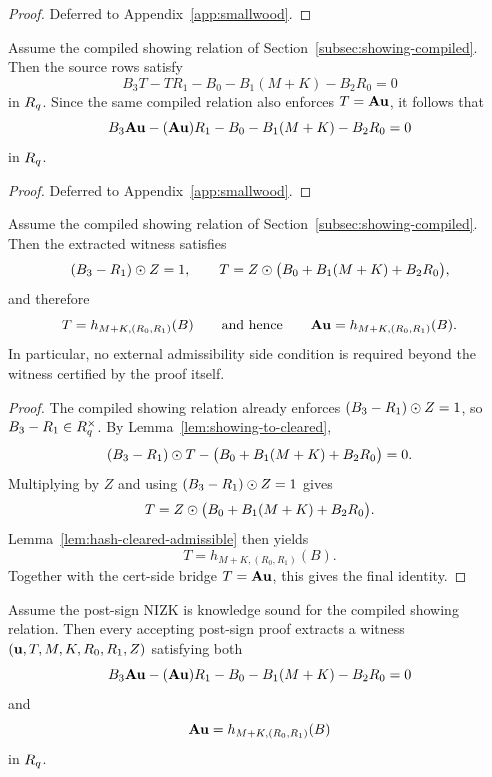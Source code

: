 \begin{proof}
Deferred to Appendix~\ref{app:smallwood}.
\end{proof}

\begin{lemma}\label{lem:showing-to-cleared}
Assume the compiled showing relation of Section~\ref{subsec:showing-compiled}. Then the source rows satisfy
\[
B_3T-TR_1-B_0-B_1(M+K)-B_2R_0=0
\]
in \(R_q\). Since the same compiled relation also enforces \(T=\mathbf{A}\mathbf{u}\), it follows that
\[
B_3\mathbf{A}\mathbf{u}-(\mathbf{A}\mathbf{u})R_1-B_0-B_1(M+K)-B_2R_0=0
\]
in \(R_q\).
\end{lemma}

\begin{proof}
Deferred to Appendix~\ref{app:smallwood}.
\end{proof}

\begin{corollary}\label{cor:showing-to-abstract}
Assume the compiled showing relation of Section~\ref{subsec:showing-compiled}. Then the extracted witness satisfies
\[
(B_3-R_1)\odot Z = 1,
\qquad
T = Z\odot\bigl(B_0+B_1(M+K)+B_2R_0\bigr),
\]
and therefore
\[
T = h_{M+K,(R_0,R_1)}(B)
\qquad\text{and hence}\qquad
\mathbf{A}\mathbf{u} = h_{M+K,(R_0,R_1)}(B).
\]
In particular, no external admissibility side condition is required beyond the witness certified by the proof itself.
\end{corollary}

\begin{proof}
The compiled showing relation already enforces \((B_3-R_1)\odot Z=1\), so \(B_3-R_1\in R_q^\times\). By
Lemma~\ref{lem:showing-to-cleared},
\[
(B_3-R_1)\odot T-\bigl(B_0+B_1(M+K)+B_2R_0\bigr)=0.
\]
Multiplying by \(Z\) and using \((B_3-R_1)\odot Z=1\) gives
\[
T = Z\odot\bigl(B_0+B_1(M+K)+B_2R_0\bigr).
\]
Lemma~\ref{lem:hash-cleared-admissible} then yields
\[
T = h_{M+K,(R_0,R_1)}(B).
\]
Together with the cert-side bridge \(T=\mathbf{A}\mathbf{u}\), this gives the final identity.
\end{proof}

\begin{corollary}\label{cor:showing-proof-consequence}
Assume the post-sign NIZK is knowledge sound for the compiled showing relation. Then every accepting post-sign proof
extracts a witness \((\mathbf{u},T,M,K,R_0,R_1,Z)\) satisfying both
\[
B_3\mathbf{A}\mathbf{u}-(\mathbf{A}\mathbf{u})R_1-B_0-B_1(M+K)-B_2R_0=0
\]
and
\[
\mathbf{A}\mathbf{u} = h_{M+K,(R_0,R_1)}(B)
\]
in \(R_q\).
\end{corollary}

